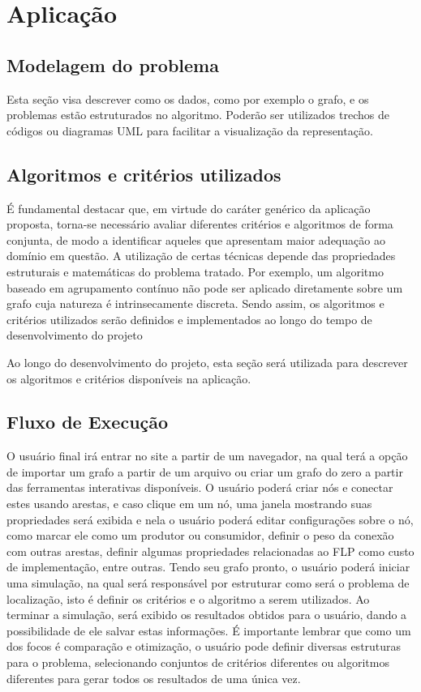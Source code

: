 \section{Aplicação}

\subsection{Modelagem do problema}
Esta seção visa descrever como os dados, como por exemplo o grafo, e os problemas estão estruturados no algoritmo. Poderão ser utilizados trechos de códigos ou diagramas UML para facilitar a visualização da representação.


\subsection{Algoritmos e critérios utilizados}
É fundamental destacar que, em virtude do caráter genérico da aplicação proposta, torna-se necessário avaliar diferentes critérios e algoritmos de forma conjunta, de modo a identificar aqueles que apresentam maior adequação ao domínio em questão. A utilização de certas técnicas depende das propriedades estruturais e matemáticas do problema tratado. Por exemplo, um algoritmo baseado em agrupamento contínuo não pode ser aplicado diretamente sobre um grafo cuja natureza é intrinsecamente discreta. Sendo assim, os algoritmos e critérios utilizados serão definidos e implementados ao longo do tempo de desenvolvimento do projeto

Ao longo do desenvolvimento do projeto, esta seção será utilizada para descrever os algoritmos e critérios disponíveis na aplicação. 

\subsection{Fluxo de Execução}
O usuário final irá entrar no site a partir de um navegador, na qual terá a opção de importar um grafo a partir de um arquivo ou criar um grafo do zero a partir das ferramentas interativas disponíveis. O usuário poderá criar nós e conectar estes usando arestas, e caso clique em um nó, uma janela mostrando suas propriedades será exibida e nela o usuário poderá editar configurações sobre o nó, como marcar ele como um produtor ou consumidor, definir o peso da conexão com outras arestas, definir algumas propriedades relacionadas ao FLP como custo de implementação, entre outras. Tendo seu grafo pronto, o usuário poderá iniciar uma simulação, na qual será responsável por estruturar como será o problema de localização, isto é definir os critérios e o algoritmo a serem utilizados. Ao terminar a simulação, será exibido os resultados obtidos para o usuário, dando a possibilidade de ele salvar estas informações. É importante lembrar que como um dos focos é comparação e otimização, o usuário pode definir diversas estruturas para o problema, selecionando conjuntos de critérios diferentes ou algoritmos diferentes para gerar todos os resultados de uma única vez.

